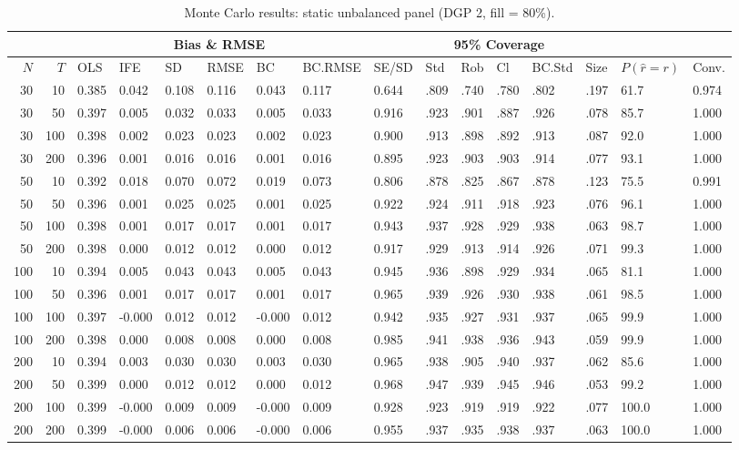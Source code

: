 \begin{table}[ht]
\centering
\caption{Monte Carlo results: static unbalanced panel (DGP 2, fill = 80\%).} 
\label{tab:mc_static_unb_f80}
\begin{tabular}{rrllllllllllllll}
  \hline
 & & \multicolumn{6}{c}{Bias \& RMSE} & & \multicolumn{4}{c}{95\% Coverage} & & & \\
\cline{3-8}\cline{10-13}
 \hline
$N$ & $T$ & OLS & IFE & SD & RMSE & BC & BC.RMSE & SE/SD & Std & Rob & Cl & BC.Std & Size & $P(\hat r=r)$ & Conv. \\ 
  \hline
30 & 10 & 0.385 & 0.042 & 0.108 & 0.116 & 0.043 & 0.117 & 0.644 & .809 & .740 & .780 & .802 & .197 & 61.7 & 0.974 \\ 
  30 & 50 & 0.397 & 0.005 & 0.032 & 0.033 & 0.005 & 0.033 & 0.916 & .923 & .901 & .887 & .926 & .078 & 85.7 & 1.000 \\ 
  30 & 100 & 0.398 & 0.002 & 0.023 & 0.023 & 0.002 & 0.023 & 0.900 & .913 & .898 & .892 & .913 & .087 & 92.0 & 1.000 \\ 
  30 & 200 & 0.396 & 0.001 & 0.016 & 0.016 & 0.001 & 0.016 & 0.895 & .923 & .903 & .903 & .914 & .077 & 93.1 & 1.000 \\ 
  50 & 10 & 0.392 & 0.018 & 0.070 & 0.072 & 0.019 & 0.073 & 0.806 & .878 & .825 & .867 & .878 & .123 & 75.5 & 0.991 \\ 
  50 & 50 & 0.396 & 0.001 & 0.025 & 0.025 & 0.001 & 0.025 & 0.922 & .924 & .911 & .918 & .923 & .076 & 96.1 & 1.000 \\ 
  50 & 100 & 0.398 & 0.001 & 0.017 & 0.017 & 0.001 & 0.017 & 0.943 & .937 & .928 & .929 & .938 & .063 & 98.7 & 1.000 \\ 
  50 & 200 & 0.398 & 0.000 & 0.012 & 0.012 & 0.000 & 0.012 & 0.917 & .929 & .913 & .914 & .926 & .071 & 99.3 & 1.000 \\ 
  100 & 10 & 0.394 & 0.005 & 0.043 & 0.043 & 0.005 & 0.043 & 0.945 & .936 & .898 & .929 & .934 & .065 & 81.1 & 1.000 \\ 
  100 & 50 & 0.396 & 0.001 & 0.017 & 0.017 & 0.001 & 0.017 & 0.965 & .939 & .926 & .930 & .938 & .061 & 98.5 & 1.000 \\ 
  100 & 100 & 0.397 & -0.000 & 0.012 & 0.012 & -0.000 & 0.012 & 0.942 & .935 & .927 & .931 & .937 & .065 & 99.9 & 1.000 \\ 
  100 & 200 & 0.398 & 0.000 & 0.008 & 0.008 & 0.000 & 0.008 & 0.985 & .941 & .938 & .936 & .943 & .059 & 99.9 & 1.000 \\ 
  200 & 10 & 0.394 & 0.003 & 0.030 & 0.030 & 0.003 & 0.030 & 0.965 & .938 & .905 & .940 & .937 & .062 & 85.6 & 1.000 \\ 
  200 & 50 & 0.399 & 0.000 & 0.012 & 0.012 & 0.000 & 0.012 & 0.968 & .947 & .939 & .945 & .946 & .053 & 99.2 & 1.000 \\ 
  200 & 100 & 0.399 & -0.000 & 0.009 & 0.009 & -0.000 & 0.009 & 0.928 & .923 & .919 & .919 & .922 & .077 & 100.0 & 1.000 \\ 
  200 & 200 & 0.399 & -0.000 & 0.006 & 0.006 & -0.000 & 0.006 & 0.955 & .937 & .935 & .938 & .937 & .063 & 100.0 & 1.000 \\ 
   \hline
\end{tabular}
\end{table}
